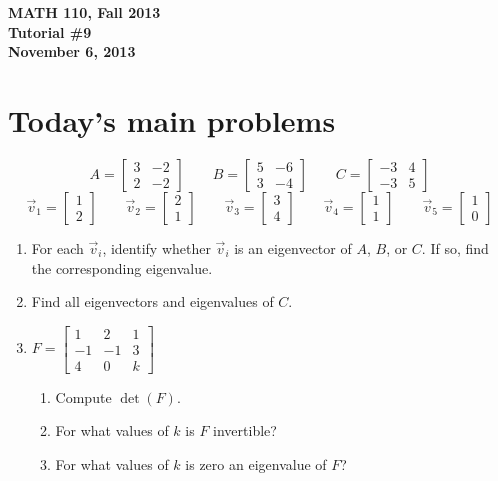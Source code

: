 \documentclass[11pt]{exam}
\newcommand{\mat}[1]{\begin{bmatrix}#1\end{bmatrix}}
\newcommand{\mthCourse}{MATH 110}
\newcommand{\mthTerm}{Fall 2013}
\newcommand{\mthTutorialNumber}{9}
\newcommand{\mthDate}{November 6, 2013}
\begin{document}
{\large
	\begin{center}
		{\bf \mthCourse, \mthTerm}\\ 
		{\bf Tutorial \#\mthTutorialNumber}\\
		{\bf \mthDate}
	\end{center}
}

\section*{Today's main problems}

		\[
			A=\mat{3&-2\\2&-2}\qquad
			B=\mat{5&-6\\3&-4}\qquad
			C=\mat{-3&4\\-3&5}
		\]
		\[
			\vec v_1=\mat{1\\2}\qquad
			\vec v_2=\mat{2\\1}\qquad
			\vec v_3=\mat{3\\4}\qquad
			\vec v_4=\mat{1\\1}\qquad
			\vec v_5=\mat{1\\0}
		\]
\begin{enumerate}
	\item For each $\vec v_i$, identify whether $\vec v_i$ is an eigenvector 
		of $A$, $B$, or $C$.  If so, find the corresponding eigenvalue.

	\item Find all eigenvectors and eigenvalues of $C$.

	\item $F=\mat{1&2&1\\-1&-1&3\\4&0&k}$
	\begin{enumerate}
		\item Compute $\det (F)$.
		\item For what values of $k$ is $F$ invertible?
		\item For what values of $k$ is zero an eigenvalue of $F$?
	\end{enumerate}
	

\end{enumerate}
\end{document}
